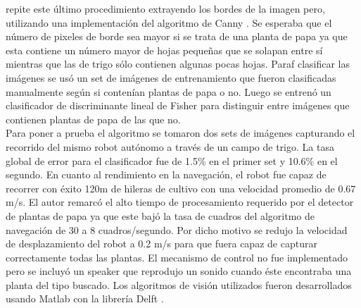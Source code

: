 	 repite este \'ultimo procedimiento extrayendo los bordes de la 
	 imagen pero,  
	 utilizando una implementaci\'on del algoritmo de Canny 
	 \cite{Canny:1986:ACA}. Se esperaba que el n\'umero de pixeles de 
	 borde sea mayor si se trata de una planta de papa ya que esta 
	 contiene un n\'umero mayor de hojas peque\~nas que se solapan entre s\'i 
	 mientras que las de trigo s\'olo contienen algunas pocas hojas. 
	 Paraf 
	 clasificar las im\'agenes se us\'o un set de im\'agenes de entrenamiento
	 que fueron clasificadas manualmente seg\'un si conten\'ian 
	 plantas de papa o no. Luego se entren\'o un 
	 clasificador de discriminante lineal de Fisher \cite{HastieEtAl2008} para distinguir 
	 entre im\'agenes que contienen plantas de papa de las que no.\\
	 \indent Para poner a prueba el algoritmo se tomaron dos sets de 
	 im\'agenes capturando el recorrido del mismo robot aut\'onomo a 
	 trav\'es de un campo de trigo. La tasa global de error para el 
	 clasificador fue de 1.5\% en el primer set y 10.6\% en el 
	 segundo. En cuanto al rendimiento en la navegaci\'on, el robot 
	 fue capaz de recorrer con \'exito 120m de hileras de cultivo con 
	 una velocidad promedio de $0.67$ m/s. El autor remarc\'o el alto 
	 tiempo de procesamiento requerido por el detector de plantas de 
	 papa ya que este baj\'o la tasa de cuadros del algoritmo de 
	 navegaci\'on de 30 a 8 cuadros/segundo. Por dicho motivo se 
	 redujo la velocidad de desplazamiento del robot a 0.2 m/s para 
	 que fuera capaz de capturar correctamente todas las plantas. 
	 El mecanismo de control no fue implementado pero se incluy\'o un 
	 speaker que reprodujo un sonido cuando \'este encontraba una planta 
	 del tipo buscado. Los algoritmos de visi\'on utilizados fueron 
	 desarrollados usando Matlab con la librer\'ia Delft \cite{DipLib}.
	 
